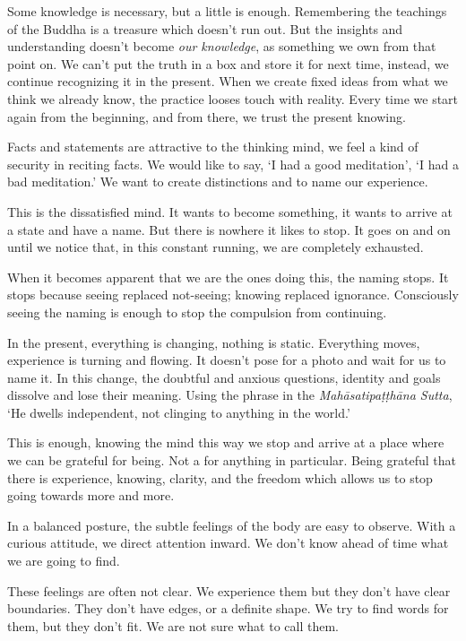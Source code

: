 
Some knowledge is necessary, but a little is enough. Remembering the
teachings of the Buddha is a treasure which doesn't run out. But the
insights and understanding doesn't become \emph{our knowledge}, as
something we own from that point on. We can't put the truth in a box and
store it for next time, instead, we continue recognizing it in the
present. When we create fixed ideas from what we think we already know,
the practice looses touch with reality. Every time we start again from
the beginning, and from there, we trust the present knowing.

Facts and statements are attractive to the thinking mind, we feel a kind
of security in reciting facts. We would like to say, `I had a good
meditation', `I had a bad meditation.' We want to create distinctions
and to name our experience.

This is the dissatisfied mind. It wants to become something, it wants to
arrive at a state and have a name. But there is nowhere it likes to
stop. It goes on and on until we notice that, in this constant running,
we are completely exhausted.

When it becomes apparent that we are the ones doing this, the naming
stops. It stops because seeing replaced not-seeing; knowing replaced
ignorance. Consciously seeing the naming is enough to stop the
compulsion from continuing.

In the present, everything is changing, nothing is static. Everything
moves, experience is turning and flowing. It doesn't pose for a photo
and wait for us to name it. In this change, the doubtful and anxious
questions, identity and goals dissolve and lose their meaning. Using the
phrase in the \emph{Mahāsatipaṭṭhāna Sutta}, `He dwells independent, not
clinging to anything in the world.'

This is enough, knowing the mind this way we stop and arrive at a place
where we can be grateful for being. Not a for anything in particular.
Being grateful that there is experience, knowing, clarity, and the
freedom which allows us to stop going towards more and more.


In a balanced posture, the subtle feelings of the body are easy to
observe. With a curious attitude, we direct attention inward. We don't
know ahead of time what we are going to find.

These feelings are often not clear. We experience them but they don't
have clear boundaries. They don't have edges, or a definite shape. We
try to find words for them, but they don't fit. We are not sure what to
call them.


